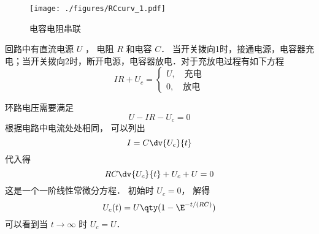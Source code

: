 
\begin{issues}
\issueDraft
\end{issues}

\begin{figure}[ht]
\centering
\texttt{[image: ./figures/RCcurv\_1.pdf]}
\caption{电容电阻串联} \label{RCcurv_fig1}
\end{figure}
回路中有直流电源 $U$ ， 电阻 $R$ 和电容 $C$． 当开关拨向1时，接通电源，电容器充电；当开关拨向2时，断开电源，电容器放电．对于充放电过程有如下方程
\begin{equation}
IR+U_c=
\begin{cases}
U, \quad\text{充电}\\
0, \quad\text{放电}
\end{cases}
\end{equation}



环路电压需要满足
\begin{equation}
U - IR - U_c = 0
\end{equation}
根据电路中电流处处相同， 可以列出
\begin{equation}
I = C\dv{U_c}{t}
\end{equation}
代入得
\begin{equation}
RC\dv{U_c}{t} + U_c + U = 0
\end{equation}
这是一个一阶线性常微分方程． 初始时 $U_c = 0$， 解得
\begin{equation}
U_c(t) = U\qty(1 - \E^{-t/(RC)})
\end{equation}
可以看到当 $t \to \infty$ 时 $U_c = U$．

